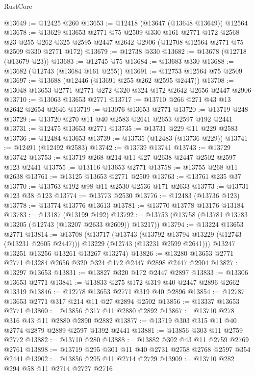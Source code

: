 \begin{lexlean}{RustCore}
\begin{coremodule}
@13649 := @12425 @260
@13653 := @12418 (@13647 (@13648 @13649)) @12564
@13678 := @13629
    @13653
    @2771
    @75
    @2509
    @330
    @161
    @2771
    @172
    @2568
    @23
    @255
    @262
    @325
    @2595
    @2447
    @2642
    @2906
    (@12708 @12564 @2771 @75 @2509 @330 @2771 @172)
@13679 := @12738 @330
@13682 := @13678 (@12718 (@13679 @23))
@13683 := @12745 @75
@13684 := @13683 @330
@13688 := @13682 (@12743 (@13684 @161 @255))
@13691 := @12753 @12564 @75 @2509
@13697 := @13688 (@12446 (@13691 @255 @262 @2595 @2447))
@13708 := @13048 @13653 @2771 @2771 @272 @320 @324 @172 @2642 @2656 @2447 @2906
@13710 := @13063 @13653 @2771
@13717 := @13710 @266 @271 @43 @13 @2642 @2654 @2646
@13719 := @13076 @13653 @2771
@13720 := @13719 @248
@13729 := @13720 @270 @11 @40 @2583 @2641 @2653 @2597 @192 @2441
@13731 := @12475 @13653 @2771
@13735 := @13731 @229 @11 @229 @2583
@13736 := @12484 @13653
@13739 := @13735 (@12483 (@13736 @229))
@13741 := @12491 (@12492 @2583)
@13742 := @13739 @13741
@13743 := @13729 @13742
@13753 := @13719 @268 @214 @11 @27 @2638 @2447 @2502 @2597 @123 @2441
@13755 := @13116 @13653 @2771
@13758 := @13755 @268 @11 @2638
@13761 := @13125 @13653 @2771 @2509
@13763 := @13761 @235 @37
@13770 := @13763 @192 @98 @11 @2530 @2536 @171 @2633
@13773 := @13731 @123 @38 @123
@13774 := @13773 @2530
@13776 := @12483 (@13736 @123)
@13778 := @13774 @13776 @13613
@13781 := @13770 @13778 @13176 @13184
@13783 := @13187 (@13199 @192)
@13792 := @13753 (@13758 (@13781 @13783 @13205 (@12743 (@13207 @2633 @2609)) @13217))
@13794 := @13224 @13653 @2771
@13814 := @13708
    (@13717
      (@13743
        (@13792 @13794 @13229 (@12743 (@13231 @2605 @2447)))
        @13229
        (@12743 (@13231 @2599 @2641)))
      @13247
      @13251
      @13256
      @13261
      @13267
      @13274)
@13826 := @13280 @13653 @2771 @2771 @13284 @2656 @320 @324 @172 @2447 @2898 @2447 @2904
@13827 := @13297 @13653
@13831 := @13827 @320 @172 @2447 @2897
@13833 := @13306 @13653 @2771
@13841 := @13833 @275 @172 @319 @40 @2447 @2896 @2662 @13319
@13846 := @12778 @13653 @2771 @319 @40 @2896
@13854 := @12787 @13653 @2771 @317 @214 @11 @27 @2894 @2502
@13856 := @13337 @13653 @2771
@13860 := @13856 @317 @11 @2880 @2892
@13867 := @13710 @278 @316 @43 @11 @2880 @2890 @2882
@13877 := @13719 @303 @315 @11 @40 @2774 @2879 @2889 @2597 @1392 @2441
@13881 := @13856 @303 @11 @2759 @2772
@13882 := @13710 @280
@13888 := @13882 @302 @43 @11 @2759 @2769 @2761
@13898 := @13719 @295 @301 @11 @40 @2731 @2758 @2768 @2597 @354 @2441
@13902 := @13856 @295 @11 @2714 @2729
@13909 := @13710 @282 @294 @58 @11 @2714 @2727 @2716

\end{coremodule}
\end{lexlean}

